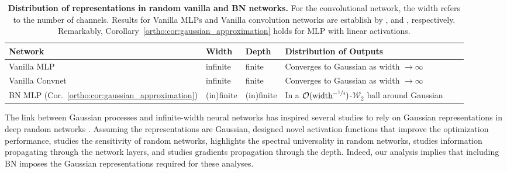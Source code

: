 \begin{table}[!ht]
    \centering
    \begin{tabular}{l l l l l l}
    \hline
      Network  & Width & Depth & Distribution of Outputs \\
    \hline 
     Vanilla MLP  & infinite  & finite & Converges to Gaussian as  width $\to \infty$ \\ 
    Vanilla Convnet  & infinite &
    finite & Converges to Gaussian as width $\to \infty$  \\
    BN MLP (Cor.~\ref{ortho:cor:gaussian_approximation}) &
    (in)finite & (in)finite & In a $\mathcal{O}(\text{width}^{-\sfrac{1}{4}})$-$\mathcal{W}_2$ ball around Gaussian\\
    \hline
    
\end{tabular}
    \vspace{0.07cm}
    \caption{\footnotesize{\textbf{Distribution of representations in random vanilla and BN networks.} For the convolutional network, the width refers to the number of channels. Results for Vanilla MLPs and Vanilla convolution networks are establish by \cite{matthews2018gaussian}, and \cite{garriga2018deep}, respectively. Remarkably, Corollary~\ref{ortho:cor:gaussian_approximation} holds for MLP with linear activations.}}
    \label{ortho:tab:normal}
\end{table}
The link between Gaussian processes and infinite-width neural networks has inspired several studies to rely on Gaussian representations in deep random networks \citep{klambauer2017self,de2018random,pennington2018emergence,schoenholz2016deep,yang2018a}. Assuming the representations are Gaussian,  \cite{klambauer2017self} designed novel activation functions that improve the optimization performance, \cite{de2018random} studies the sensitivity of random networks, \cite{pennington2018emergence} highlights the spectral universality in random networks, \cite{schoenholz2016deep} studies information propagating through the network layers, and \cite{yang2018a} studies gradients propagation through the depth.  Indeed, our analysis implies that including BN imposes the Gaussian representations required for these analyses. 

 

